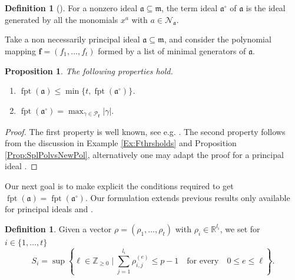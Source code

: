 \documentclass[12pt]{amsart}
\newtheorem{proposition}[theorem]{Proposition}
\theoremstyle{definition}
\newtheorem{definition}[theorem]{Definition}
\numberwithin{equation}{subsection}
\DeclareMathOperator{\fpt}{fpt}
\newcommand{\RR}{\mathbb{R}}
\newcommand{\m}{\mathfrak{m}}
\newcommand{\fa}{\mathfrak{a}}
\newcommand{\SP}{\mathcal{P}}
\newcommand{\N}{\mathcal{N}}
\newcommand{\Bf}{\boldsymbol{f}}
\renewcommand{\!}[1]{{\color{red}\text{\Huge$\star$ }#1}}
\begin{document}
\begin{definition}[\cite{BiFuSa}]\label{Def:Term Ideal}
	For a nonzero ideal $\fa \subseteq \m$, the term ideal $\fa^\circ$ of $\fa$ is the ideal generated by all the monomials $x^a$ with $a\in \N_{\fa}$.
\end{definition}

Take a non necessarily principal ideal $\fa\subseteq \m$, and consider the polynomial mapping $\Bf=(f_1,\ldots,f_t)$ formed by a list of minimal generators of $\fa$. 
\begin{proposition}\label{Prop:Properties ftt ideals}The following properties hold.
	\begin{enumerate}
		\item $\fpt(\fa)\leq \min\{t, \fpt(\fa^\circ)\}$.
		\item $\fpt(\fa^\circ)=\max_{\gamma\in \SP_{\Bf} } |\gamma|.$
	\end{enumerate}
\end{proposition}
\begin{proof}
	The first property is well known, see e.g. \cite{MTW}. The second property follows from the discussion in Example \ref{Ex:Fthrsholds} and Proposition  \ref{Prop:SplPolvsNewPol}, alternatively one may adapt the proof for a principal ideal \cite[Proposition $36$]{HDpolynomials}.
\end{proof}
Our next goal is to make explicit the conditions required to get $\fpt(\fa)=\fpt(\fa^\circ)$. Our formulation extends previous results only available for principal ideals \cite[Theorem 42]{HDpolynomials}  and \cite[Theorem 4.1]{HDbinomial}. 
\begin{definition}\label{Def:S-i}
	Given a vector $\rho=(\rho_1, \ldots, \rho_t)$ with $\rho_i \in \RR^{l_i}$, we set for $i\in\{1,\ldots,t\}$
	$$S_i=\sup \left\{\ell\in\mathbb{Z}_{\geq 0} \mid \sum_{j=1}^{l_i} \rho_{i,j}^{(e)}  \leq p-1\quad\text{for every}\quad 0 \leq e \leq \ell  \right\}.$$ 
\end{definition}
\end{document}
